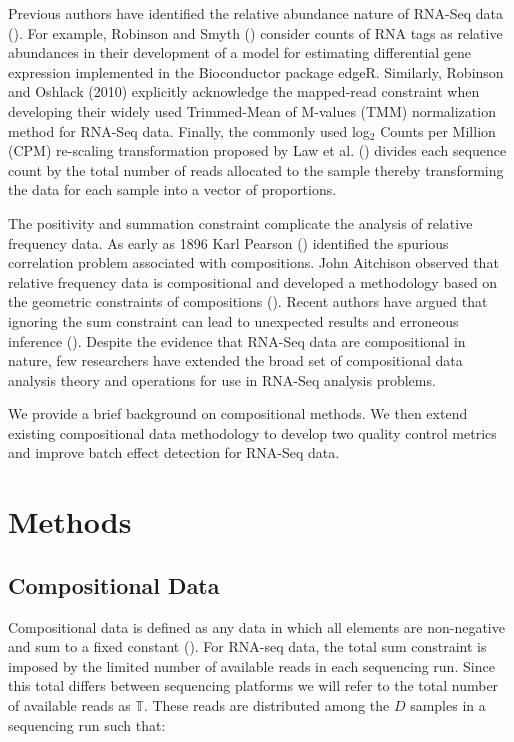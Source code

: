 \documentclass [10pt]{article}
\theoremstyle{definition}
\begin{document}
Previous authors have identified the relative abundance nature of RNA-Seq data (\cite{Robinson2007, Anders2010, Robinson2010, Law2014, Lovell2015}).  For example, Robinson and Smyth (\citeyear{Robinson2007}) consider counts of RNA tags as relative abundances in their development of a model for estimating differential gene expression implemented in the Bioconductor package edgeR.  Similarly, Robinson and Oshlack (2010) explicitly acknowledge the mapped-read constraint when developing their widely used Trimmed-Mean of M-values (TMM) normalization method for RNA-Seq data. Finally, the commonly used log$_2$ Counts per Million (CPM) re-scaling transformation proposed by Law et al. (\citeyear{Law2014})  divides each sequence count by the total number of reads allocated to the sample thereby transforming the data for each sample into a vector of proportions. %


The positivity and summation constraint complicate the analysis of relative frequency data.  As early as 1896 Karl Pearson (\cite{Pearson1896}) identified the spurious correlation problem associated with compositions.  John Aitchison observed that relative frequency data is compositional and developed a methodology based on the geometric constraints of compositions (\cite{Aitchison1986}).  Recent authors have argued that ignoring the sum constraint can lead to unexpected results and erroneous inference (\cite{Lovell2011}).  Despite the evidence that RNA-Seq data are compositional in nature, few researchers have extended the broad set of compositional data analysis theory and operations for use in RNA-Seq analysis problems.  

We provide a brief background on compositional methods.  We then extend existing compositional data methodology to develop two quality control metrics and improve batch effect detection for RNA-Seq data.\\%

%

\section{Methods}

\subsection{Compositional Data}
Compositional data is defined as any data in which all elements are non-negative and sum to a fixed constant (\cite{Aitchison1986}). %
For RNA-seq data, the total sum constraint is imposed by the limited number of available reads in each sequencing run.  Since this total differs between sequencing platforms we will refer to the total number of available reads as $\mathbb{T}$. These reads are distributed among the $D$ samples in a sequencing run such that:
\end{document}
